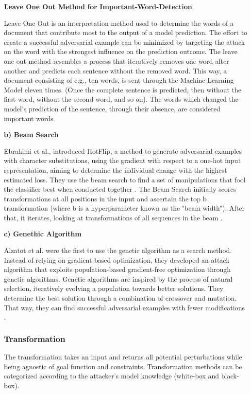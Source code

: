         \textbf{Leave One Out Method for Important-Word-Detection}
        

        Leave One Out is an interpretation method used to determine the words of a document that contribute most to the output of a model prediction. The effort to create a successful adversarial example can be minimized by targeting the attack on the word with the strongest influence on the prediction outcome. The leave one out method resembles a process that iteratively removes one word after another and predicts each sentence without the removed word. 
        This way, a document consisting of e.g., ten words, is sent through the Machine Learning Model eleven times. (Once the complete sentence is predicted, then without the first word, without the second word, and so on). The words which changed the model's prediction of the sentence, through their absence, are considered important words. 
        
    \textbf{b) Beam Search}
    
        Ebrahimi et al., introduced HotFlip, a method to generate adversarial examples with character substitutions, using the gradient with respect to a one-hot input representation, aiming to determine the individual change with the highest estimated loss. They use the beam search to find a set of manipulations that fool the classifier best when conducted together \cite{ebrahimi2017hotflip}. The Beam Search initially scores transformations at all positions in the input and ascertain the top b transformation (where b is a hyperparameter known as the "beam width"). After that, it iterates, looking at transformations of all sequences in the beam \cite{tillmann2003word}. 
        
    \textbf{c) Genethic Algorithm}
    
        Alzatot et al. were the first to use the genetic algorithm as a search method. Instead of relying on gradient-based optimization, they developed an attack algorithm that exploits population-based gradient-free optimization through genetic algorithms. Genetic algorithms are inspired by the process of natural selection, iteratively evolving a population towards better solutions. They determine the best solution through a combination of crossover and mutation. That way, they can find successful adversarial examples with fewer modifications \cite{alzantot2018generating}.
        
        
\subsubsection{Transformation}
    The transformation takes an input and returns all potential perturbations while being agnostic of goal function and constraints. Transformation methods can be categorized according to the attacker's model knowledge (white-box and black-box).

